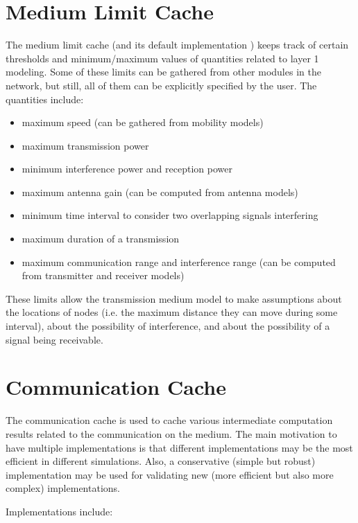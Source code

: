 \section{Medium Limit Cache}
\label{sec:medium:medium-limit-cache}

The medium limit cache (and its default implementation )
keeps track of certain thresholds and minimum/maximum values of quantities
related to layer 1 modeling. Some of these limits can be gathered from other
modules in the network, but still, all of them can be explicitly specified by the user.
The quantities include:

\begin{itemize}
    \item maximum speed (can be gathered from mobility models)
    \item maximum transmission power
    \item minimum interference power and reception power
    \item maximum antenna gain (can be computed from antenna models)
    \item minimum time interval to consider two overlapping signals interfering
    \item maximum duration of a transmission
    \item maximum communication range and interference range
      (can be computed from transmitter and receiver models)
\end{itemize}

These limits allow the transmission medium model to make assumptions about the
locations of nodes (i.e. the maximum distance they can move during some
interval), about the possibility of interference, and about the possibility
of a signal being receivable.


\section{Communication Cache}
\label{sec:medium:communication-cache}

The communication cache is used to cache various intermediate computation
results related to the communication on the medium. The main motivation to have
multiple implementations is that different implementations may be the most
efficient in different simulations. Also, a conservative (simple but robust)
implementation may be used for validating new (more efficient but also more
complex) implementations.

Implementations include:

